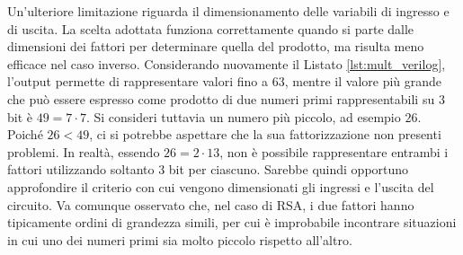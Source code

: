 \documentclass[]{article}
\begin{document}
	
	Un'ulteriore limitazione riguarda il dimensionamento delle variabili di ingresso e di uscita. La scelta adottata funziona correttamente quando si parte dalle dimensioni dei fattori per determinare quella del prodotto, ma risulta meno efficace nel caso inverso. Considerando nuovamente il Listato \ref{lst:mult_verilog}, l'output permette di rappresentare valori fino a $63$, mentre il valore più grande che può essere espresso come prodotto di due numeri primi rappresentabili su $3$ bit è $49 = 7 \cdot 7$. Si consideri tuttavia un numero più piccolo, ad esempio $26$. Poiché $26 < 49$, ci si potrebbe aspettare che la sua fattorizzazione non presenti problemi. In realtà, essendo $26 = 2 \cdot 13$, non è possibile rappresentare entrambi i fattori utilizzando soltanto $3$ bit per ciascuno. Sarebbe quindi opportuno approfondire il criterio con cui vengono dimensionati gli ingressi e l'uscita del circuito. Va comunque osservato che, nel caso di RSA, i due fattori hanno tipicamente ordini di grandezza simili, per cui è improbabile incontrare situazioni in cui uno dei numeri primi sia molto piccolo rispetto all'altro.
	
	\printbibliography
	
	
	
\end{document}

